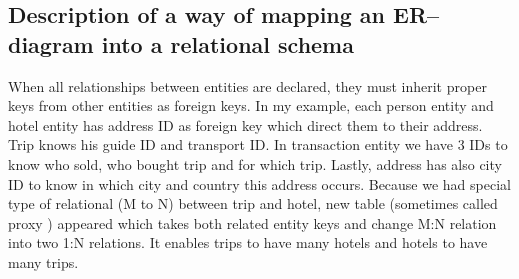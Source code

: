 \documentclass{article}
\begin{document}
\subsection{Description of a way of mapping an ER–diagram into a relational schema}
When all relationships between entities are declared, they must inherit proper keys from other entities as foreign keys.
In my example, each person entity and hotel entity has address ID as foreign key which direct them to their address.
Trip knows his guide ID and transport ID. In transaction entity we have 3 IDs to know who sold, who bought trip and for which trip.
Lastly, address has also city ID to know in which city and country this address occurs.
Because we had special type of relational (M to N) between trip and hotel, new table (sometimes called proxy ) appeared which takes both related entity keys
and change M:N relation into two 1:N relations. It enables trips to have many hotels and hotels to have many trips.
\end{document}
